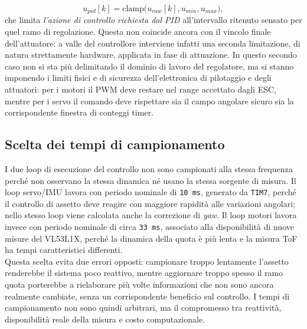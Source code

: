 \documentclass[11pt]{report}
\begin{document}
	\begin{equation}
		u_{pid}[k]=\mathrm{clamp}\bigl(u_{raw}[k],u_{min},u_{max}\bigr),
	\end{equation}
	che limita \emph{l'azione di controllo richiesta dal PID} all'intervallo ritenuto sensato per quel ramo di regolazione. Questa non coincide ancora con il vincolo finale dell'attuatore: a valle del controllore interviene infatti una seconda limitazione, di natura strettamente hardware, applicata in fase di attuazione. In questo secondo caso non si sta più delimitando il dominio di lavoro del regolatore, ma si stanno imponendo i limiti fisici e di sicurezza dell'elettronica di pilotaggio e degli attuatori: per i motori il PWM deve restare nel range accettato dagli ESC, mentre per i servo il comando deve rispettare sia il campo angolare sicuro sia la corrispondente finestra di conteggi timer.
	
	\subsection{Scelta dei tempi di campionamento}
	I due loop di esecuzione del controllo non sono campionati alla stessa frequenza perché non osservano la stessa dinamica né usano la stessa sorgente di misura. Il loop servo/IMU lavora con periodo nominale di \texttt{10 ms}, generato da \texttt{TIM7}, perché il controllo di assetto deve reagire con maggiore rapidità alle variazioni angolari; nello stesso loop viene calcolata anche la correzione di \textit{yaw}. Il loop motori lavora invece con periodo nominale di circa \texttt{33 ms}, associato alla disponibilità di nuove misure del VL53L1X, perché la dinamica della quota è più lenta e la misura ToF ha tempi caratteristici differenti.\\
	Questa scelta evita due errori opposti: campionare troppo lentamente l'assetto renderebbe il sistema poco reattivo, mentre aggiornare troppo spesso il ramo quota porterebbe a rielaborare più volte informazioni che non sono ancora realmente cambiate, senza un corrispondente beneficio sul controllo. I tempi di campionamento non sono quindi arbitrari, ma il compromesso tra reattività, disponibilità reale della misura e costo computazionale.
	
\end{document}
